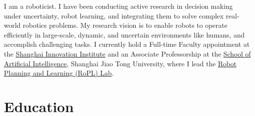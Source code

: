 \documentclass[10pt,letterpaper,sans]{moderncv}
\begin{document}
\makecvtitle
\vspace*{-0.7cm}

I am a roboticist. I have been conducting active research in decision making under uncertainty, robot learning, and integrating them to solve complex real-world robotics problems. My research vision is to enable robots to operate efficiently in large-scale, dynamic, and uncertain environments like humans, and accomplish challenging tasks. I currently hold a Full-time Faculty appointment at the \href{https://www.sii.edu.cn/2025/1001/c82a512/page.htm}{Shanghai Innovation Institute} and an Associate Professorship at the \href{https://soai.sjtu.edu.cn/cn/facultydetails/zzjs/caipanpan}{School of Artificial Intelligence}, Shanghai Jiao Tong University, where I lead the \href{https://www.ropl.ai}{Robot Planning and Learning (RoPL) Lab}.

\section{Education}
\end{document}
